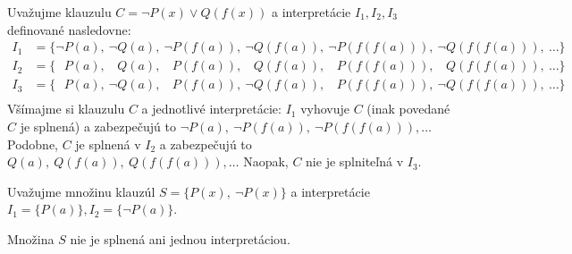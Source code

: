 \begin{priklad}
    Uvažujme klauzulu $C=\neg P(x) \lor Q(f(x))$ a
    interpretácie $I_1,I_2,I_3$ definované nasledovne:
    \newcommand{\phn}{\phantom{\neg}}
    \begin{align*}
        I_1 &= \{ \neg P(a),\ \neg Q(a),\ \neg P(f(a)),\ 
            \neg Q(f(a)),\ \neg P(f(f(a))),\ \neg Q(f(f(a))),\ \dots \} \\
        I_2 &= \{ \phn P(a),\ \phn Q(a),\ \phn P(f(a)),\ 
            \phn Q(f(a)),\ \phn P(f(f(a))),\ \phn Q(f(f(a))),\ \dots \} \\
        I_3 &= \{ \phn P(a),\ \neg Q(a),\ \phn P(f(a)),\
            \neg Q(f(a)),\ \phn P(f(f(a))),\ \neg Q(f(f(a))),\ \dots \} \\
    \end{align*}
    \def\phn{\undefined}
    Všímajme si klauzulu $C$ a jednotlivé interpretácie:
    $I_1$ vyhovuje $C$ (inak povedané $C$ je splnená) a zabezpečujú to
    $\neg P(a),\ \neg P(f(a)),\ \neg P(f(f(a))), \dots$
    Podobne, $C$ je splnená v $I_2$ a zabezpečujú to
    $Q(a),\ Q(f(a)),\ Q(f(f(a))), \dots$ Naopak, $C$ nie je
    splniteľná v $I_3$.
\end{priklad}

\begin{priklad}
    Uvažujme množinu klauzúl $S=\{P(x),\ \neg P(x)\}$ a
    interpretácie $I_1 = \{ P(a) \}, I_2 = \{ \neg P(a) \}$.

    Množina $S$ nie je splnená ani jednou interpretáciou.
\end{priklad}

